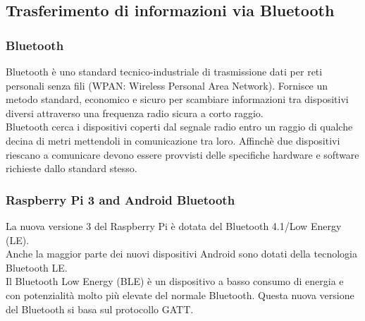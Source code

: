 \documentclass{article}
\begin{document}
\subsection{Trasferimento di informazioni via Bluetooth}
\subsubsection{Bluetooth}
Bluetooth è uno standard tecnico-industriale di trasmissione dati per reti personali senza fili (WPAN: Wireless Personal Area Network). Fornisce un metodo standard, economico e sicuro per scambiare informazioni tra dispositivi diversi attraverso una frequenza radio sicura a corto raggio.\\
Bluetooth cerca i dispositivi coperti dal segnale radio entro un raggio di qualche decina di metri mettendoli in comunicazione tra loro. Affinchè due dispositivi riescano a comunicare devono essere provvisti delle specifiche hardware e software richieste dallo standard stesso.
\subsubsection{Raspberry Pi 3 and Android Bluetooth}
La nuova versione 3 del Raspberry Pi è dotata del Bluetooth 4.1/Low Energy (LE).\\
Anche la maggior parte dei nuovi dispositivi Android sono dotati della tecnologia Bluetooth LE.\\
Il Bluetooth Low Energy (BLE) è un dispositivo a basso consumo di energia e con potenzialità molto più elevate del normale Bluetooth. Questa nuova versione del Bluetooth si basa sul protocollo GATT.
\end{document}
